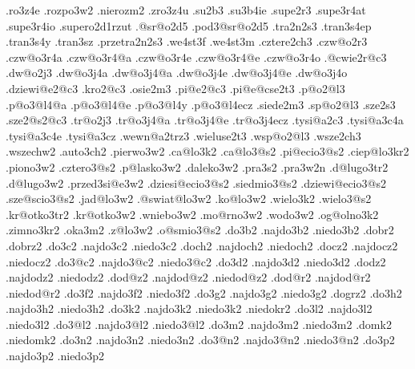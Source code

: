 {            .ro3z4e      .rozpo3w2                 .nierozm2    .zro3z4u
  .su2b3 
            .su3b4ie
  .supe2r3 
            .supe3r4at   .supe3r4io   .supero2d1rzut
  .@sr@o2d5
            .pod3@sr@o2d5
  .tra2n2s3 
            .tran3s4ep    .tran3s4y    .tran3sz     .przetra2n2s3
            .we4st3f      .we4st3m
%
%
  .cztere2ch3
  .czw@o2r3   .czw@o3r4a  .czw@o3r4@a  .czw@o3r4e  .czw@o3r4@e  .czw@o3r4o
  .@cwie2r@c3 
  .dw@o2j3    .dw@o3j4a   .dw@o3j4@a   .dw@o3j4e   .dw@o3j4@e   .dw@o3j4o
  .dziewi@e2@c3
  .kro2@c3
  .osie2m3
  .pi@e2@c3   
  .pi@e@cse2t3
  .p@o2@l3    .p@o3@l4@a   .p@o3@l4@e    .p@o3@l4y    .p@o3@l4ecz
  .siede2m3        
  .sp@o2@l3 
  .sze2s3
  .sze2@s2@c3
  .tr@o2j3    .tr@o3j4@a   .tr@o3j4@e    .tr@o3j4ecz
  .tysi@a2c3  .tysi@a3c4a  .tysi@a3c4e   .tysi@a3cz   
  .wewn@a2trz3
  .wieluse2t3
  .wsp@o2@l3  
  .wsze2ch3   .wszechw2
%
%
  .auto3ch2                               .pierwo3w2
  .ca@lo3k2       .ca@lo3@s2              .pi@ecio3@s2
  .ciep@lo3kr2                            .piono3w2
  .cztero3@s2                             .p@lasko3w2
  .daleko3w2                              .pra3s2         .pra3w2n
  .d@lugo3tr2     .d@lugo3w2              .przed3si@e3w2
  .dziesi@ecio3@s2                        .siedmio3@s2
  .dziewi@ecio3@s2                        .sze@scio3@s2
  .jad@lo3w2                              .@swiat@lo3w2  
  .ko@lo3w2                               .wielo3k2       .wielo3@s2
  .kr@otko3tr2    .kr@otko3w2             .wniebo3w2
  .mo@rno3w2                              .wodo3w2
  .og@olno3k2                             .zimno3kr2
  .oka3m2                                 .z@lo3w2
  .o@smio3@s2
%
%
  .do3b2   .najdo3b2   .niedo3b2   
  .dobr2   
  .dobrz2  
  .do3c2   .najdo3c2   .niedo3c2   
  .doch2   .najdoch2   .niedoch2   
  .docz2   .najdocz2   .niedocz2   
  .do3@c2  .najdo3@c2  .niedo3@c2  
  .do3d2   .najdo3d2   .niedo3d2   
  .dodz2   .najdodz2   .niedodz2   
  .dod@z2  .najdod@z2  .niedod@z2  
  .dod@r2  .najdod@r2  .niedod@r2  
  .do3f2   .najdo3f2   .niedo3f2   
  .do3g2   .najdo3g2   .niedo3g2   
  .dogrz2
  .do3h2   .najdo3h2   .niedo3h2   
  .do3k2   .najdo3k2   .niedo3k2   
                       .niedokr2
  .do3l2   .najdo3l2   .niedo3l2   
  .do3@l2  .najdo3@l2  .niedo3@l2  
  .do3m2   .najdo3m2   .niedo3m2   
  .domk2               .niedomk2   
  .do3n2   .najdo3n2   .niedo3n2   
  .do3@n2  .najdo3@n2  .niedo3@n2  
  .do3p2   .najdo3p2   .niedo3p2     
}
